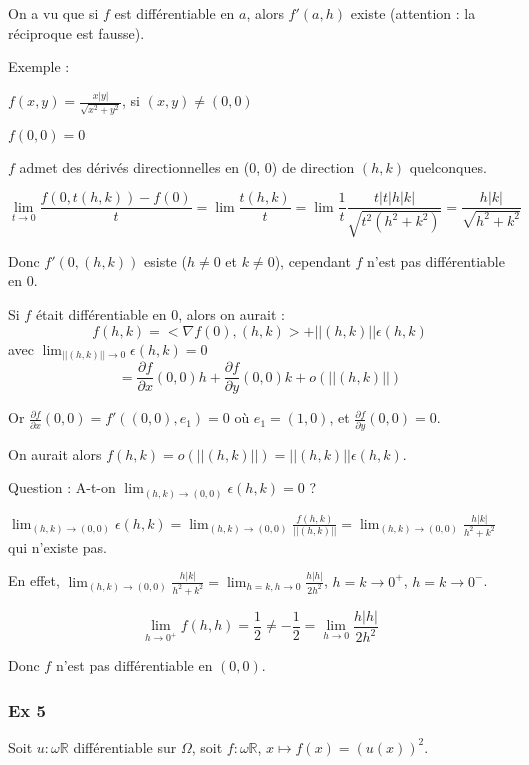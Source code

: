 		On a vu que si $f$ est différentiable en $a$, alors $f'(a, h)$ existe (attention : la réciproque est fausse).
		
		Exemple : 
		
		$f(x, y) = \frac{x |y|}{\sqrt{x^2+y^2}}$, si $(x, y) \ne (0, 0)$
		
		$f(0, 0) = 0$
		
		$f$ admet des dérivés directionnelles en (0, 0) de direction $(h, k)$ quelconques.
		
		\[ \lim_{t \rightarrow 0} \frac{ f(0, t(h, k)) - f(0) }{t} = \lim \frac{ t(h, k)}{t} = \lim \frac{1}{t} \frac{t |t| h |k|}{ \sqrt{t^2 (h^2+k^2)}} = \frac{h|k|}{\sqrt{h^2+k^2}} \]
		
		Donc $f'(0, (h, k))$ esiste ($h\ne0$ et $k\ne0$), cependant $f$ n'est pas différentiable en $0$.
		
		Si $f$ était différentiable en 0, alors on aurait : \[ f(h, k) = < \nabla f(0), (h, k)> + ||(h, k)|| \epsilon (h, k) \] 
		avec $\lim_{||(h, k)|| \rightarrow 0} \epsilon (h, k) = 0$
		\[ = \frac{ \partial f}{\partial x} (0, 0) h + \frac{ \partial f}{\partial y} (0, 0) k + o(||(h, k)||) \]
		
		Or $ \frac{ \partial f}{\partial x} (0, 0) = f' ((0, 0), e_1) = 0$ où $e_1 = (1, 0)$, et $ \frac{ \partial f}{\partial y} (0, 0) = 0$.
		
		On aurait alors $f(h, k) = o(||(h, k)||) = ||(h, k)|| \epsilon (h, k)$.
		
		Question : A-t-on $\lim_{(h, k) \rightarrow (0, 0)} \epsilon (h, k) = 0 $ ?
		
		$\lim_{(h, k) \rightarrow (0, 0)} \epsilon (h, k) = \lim_{(h, k) \rightarrow (0, 0)} \frac{f(h, k)}{||(h, k)||} = \lim_{(h, k) \rightarrow (0, 0)} \frac{h|k|}{h^2+k^2}$ qui n'existe pas.
		
		En effet, $\lim_{(h, k) \rightarrow (0, 0)} \frac{h|k|}{h^2+k^2} = \lim_{h=k, h \rightarrow 0} \frac{h|h|}{2h^2}$, $h=k \rightarrow 0^+$,  $h=k \rightarrow 0^-$.
		
		\[ \lim_{h \rightarrow 0^+} f(h, h) = \frac{1}{2} \ne -\frac{1}{2} = \lim_{h \rightarrow 0} \frac{h|h|}{2h^2} \]
		
		Donc $f$ n'est pas différentiable en $(0, 0)$.
		
		
		\subsubsection{Ex 5}
		
		Soit $u: \omega \mathbb{R}$ différentiable sur $\Omega$, soit $f: \omega \mathbb{R}$, $ x \mapsto f(x) = (u(x))^2$.
		
